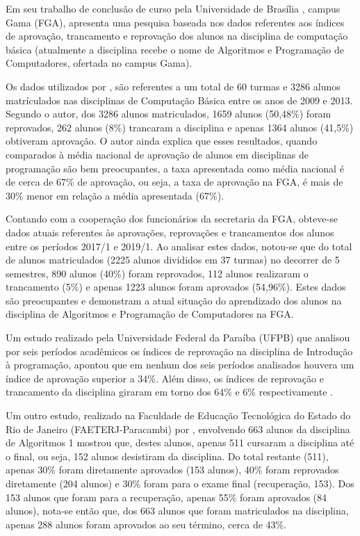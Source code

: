 Em seu trabalho de conclusão de curso pela Universidade de Brasília , campus Gama (FGA),  apresenta uma pesquisa 
baseada nos dados referentes aos índices de aprovação, trancamento e reprovação dos alunos na disciplina de computação básica (atualmente
a disciplina recebe o nome de Algoritmos e Programação de Computadores, ofertada no campus Gama). 

Os dados utilizados por , são referentes a um total de 60 turmas e 3286 alunos matrículados nas disciplinas de Computação Básica entre
os anos de 2009 e 2013. Segundo o autor, dos 3286 alunos matriculados, 1659 alunos (50,48\%) foram reprovados, 262 alunos (8\%) trancaram
a disciplina e apenas 1364 alunos (41,5\%) obtiveram aprovação. O autor ainda explica que esses resultados, quando comparados à média nacional de 
aprovação de alunos em disciplinas de programação são bem preocupantes, a taxa apresentada como média nacional é de cerca de 67\% de aprovação, ou 
seja, a taxa de aprovação na FGA, é mais de 30\% menor em relação a média apresentada (67\%).

Contando com a cooperação dos funcionários da secretaria da FGA, obteve-se dados atuais referentes às aprovações, reprovações e trancamentos dos
alunos entre os períodos 2017/1 e 2019/1. Ao analisar estes dados, notou-se que do total de alunos matriculados (2225 alunos divididos em 37 turmas) no decorrer
de 5 semestres, 890 alunos (40\%) foram reprovados, 112 alunos realizaram o trancamento (5\%) e apenas 1223 alunos foram aprovados (54,96\%). Estes dados são preocupantes 
e demonstram a atual situação do aprendizado dos alunos na disciplina de Algoritmos e Programação de Computadores na FGA.

Um estudo realizado pela Universidade Federal da Paraíba (UFPB) que analisou por seis períodos 
acadêmicos os índices de reprovação na disciplina de Introdução à programação, apontou que 
em nenhum dos seis períodos analisados houvera um índice de aprovação superior a 34\%. Além disso,
os índices de reprovação e trancamento da disciplina giraram em torno dos 64\% e 6\% respectivamente \cite{SBIE6739}.

Um outro estudo, realizado na Faculdade de Educação Tecnológica do Estado do Rio de Janeiro (FAETERJ-Paracambi) por , 
envolvendo 663 alunos da disciplina de Algoritmos 1 mostrou que, destes alunos, apenas 511 cursaram a disciplina 
até o final, ou seja, 152 alunos desistiram da disciplina. Do total restante (511), apenas 30\% foram
diretamente aprovados (153 alunos), 40\% foram reprovados diretamente (204 alunos) e 30\% foram para o exame final (recuperação, 153).
Dos 153 alunos que foram para a recuperação, apenas 55\% foram aprovados (84 alunos), nota-se então que, dos 663 alunos que
foram matriculados na disciplina, apenas  288 alunos foram aprovados ao seu término, cerca de 43\%.


